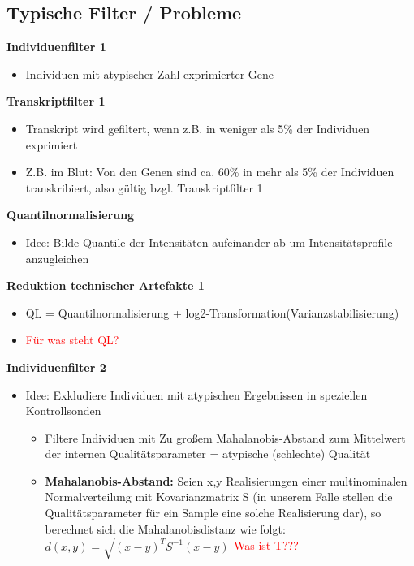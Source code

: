 \subsection{Typische Filter / Probleme}
\textbf{Individuenfilter 1}
\begin{itemize}
	\item Individuen mit atypischer Zahl exprimierter Gene
\end{itemize}

\textbf{Transkriptfilter 1}
\begin{itemize}
	\item Transkript wird gefiltert, wenn z.B. in weniger als 5\% der Individuen exprimiert
	\item Z.B. im Blut: Von den Genen sind ca. 60\% in mehr als 5\% der Individuen transkribiert, also gültig bzgl. Transkriptfilter 1
\end{itemize}

\textbf{Quantilnormalisierung}
\begin{itemize}
	\item Idee: Bilde Quantile der Intensitäten aufeinander ab um Intensitätsprofile anzugleichen
\end{itemize}

\textbf{Reduktion technischer Artefakte 1}
\begin{itemize}
	\item QL = Quantilnormalisierung + log2-Transformation(Varianzstabilisierung)
	\item \textcolor{red}{Für was steht QL?}
\end{itemize}

\textbf{Individuenfilter 2}
\begin{itemize}
	\item Idee: Exkludiere Individuen mit atypischen Ergebnissen in speziellen Kontrollsonden
	\begin{itemize}
		\item Filtere Individuen mit Zu großem Mahalanobis-Abstand zum Mittelwert der internen Qualitätsparameter = atypische (schlechte) Qualität
		\item \textbf{Mahalanobis-Abstand:} Seien x,y Realisierungen einer multinominalen Normalverteilung mit Kovarianzmatrix S (in unserem Falle stellen die Qualitätsparameter für ein Sample eine solche Realisierung dar), so berechnet sich die Mahalanobisdistanz wie folgt:\\
$d(x,y)=\sqrt{(x-y)^T S^{-1}(x-y)}$ \textcolor{red}{Was ist T???}
	\end{itemize}
\end{itemize}

